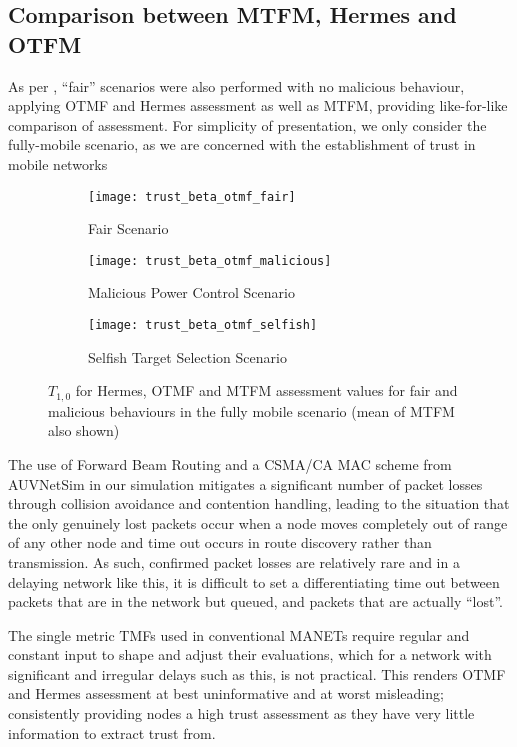 \subsection{Comparison between MTFM, Hermes and OTFM}
As per \cite{Guo11}, ``fair'' scenarios were also performed with no malicious behaviour, applying OTMF and Hermes assessment as well as MTFM, providing like-for-like comparison of assessment.
For simplicity of presentation, we only consider the fully-mobile scenario, as we are concerned with the establishment of trust in mobile networks

\begin{figure*}[t]
	\begin{subfigure}{0.32\textwidth}	
	\caption{Fair Scenario}
	\texttt{[image: trust\_beta\_otmf\_fair]}
	\label{fig:all_mobile_fair_beta}
	\end{subfigure}
	\begin{subfigure}{0.32\textwidth}
	\caption{Malicious Power Control Scenario}
	\texttt{[image: trust\_beta\_otmf\_malicious]} 
	\label{fig:all_mobile_badmouthing_beta}
	\end{subfigure}
	\begin{subfigure}{0.32\textwidth}	
	\caption{Selfish Target Selection Scenario}
	\texttt{[image: trust\_beta\_otmf\_selfish]} 
	\label{fig:all_mobile_selfish_beta}
	\end{subfigure}
	\caption{$T_{1,0}$ for Hermes, OTMF and MTFM assessment values for fair and malicious behaviours in the fully mobile scenario (mean of MTFM also shown)}
	\label{fig:otmf_beta_comparison}
\end{figure*}
%
The use of Forward Beam Routing and a CSMA/CA MAC scheme from AUVNetSim \cite{Miquel2008} in our simulation mitigates a significant number of packet losses through collision avoidance and contention handling, leading to the situation that the only genuinely lost packets occur when a node moves completely out of range of any other node and time out occurs in route discovery rather than transmission.
As such, confirmed packet losses are relatively rare and in a delaying network like this, it is difficult to set a differentiating time out between packets that are in the network but queued, and packets that are actually ``lost''.

The single metric TMFs used in conventional MANETs require regular and constant input to shape and adjust their evaluations, which for a network with significant and irregular delays such as this, is not practical.
This renders OTMF and Hermes assessment at best uninformative and at worst misleading; consistently providing nodes a high trust assessment as they have very little information to extract trust from. 

